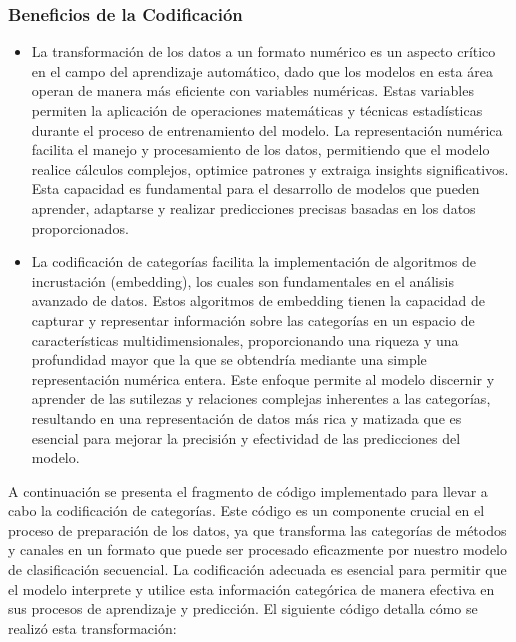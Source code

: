 \subsubsection{Beneficios de la Codificación}

\begin{itemize}
    \item La transformación de los datos a un formato numérico es un aspecto crítico en el campo del aprendizaje automático, dado que los modelos en esta área operan de manera más eficiente con variables numéricas. Estas variables permiten la aplicación de operaciones matemáticas y técnicas estadísticas durante el proceso de entrenamiento del modelo. La representación numérica facilita el manejo y procesamiento de los datos, permitiendo que el modelo realice cálculos complejos, optimice patrones y extraiga insights significativos. Esta capacidad es fundamental para el desarrollo de modelos que pueden aprender, adaptarse y realizar predicciones precisas basadas en los datos proporcionados.
    \item La codificación de categorías facilita la implementación de algoritmos de incrustación (embedding), los cuales son fundamentales en el análisis avanzado de datos. Estos algoritmos de embedding tienen la capacidad de capturar y representar información sobre las categorías en un espacio de características multidimensionales, proporcionando una riqueza y una profundidad mayor que la que se obtendría mediante una simple representación numérica entera. Este enfoque permite al modelo discernir y aprender de las sutilezas y relaciones complejas inherentes a las categorías, resultando en una representación de datos más rica y matizada que es esencial para mejorar la precisión y efectividad de las predicciones del modelo.
\end{itemize}

A continuación se presenta el fragmento de código implementado para llevar a cabo la codificación de categorías. Este código es un componente crucial en el proceso de preparación de los datos, ya que transforma las categorías de métodos y canales en un formato que puede ser procesado eficazmente por nuestro modelo de clasificación secuencial. La codificación adecuada es esencial para permitir que el modelo interprete y utilice esta información categórica de manera efectiva en sus procesos de aprendizaje y predicción. El siguiente código detalla cómo se realizó esta transformación:

